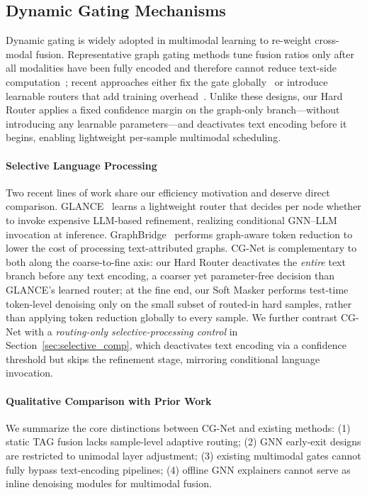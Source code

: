 \documentclass[preprint,12pt,authoryear]{elsarticle}
\begin{document}
\subsection{Dynamic Gating Mechanisms}
Dynamic gating is widely adopted in multimodal learning to re-weight cross-modal fusion. Representative graph gating methods tune fusion ratios only after all modalities have been fully encoded and therefore cannot reduce text-side computation~\citep{wei2023lightgt_icml}; recent approaches either fix the gate globally~\citep{yang2026globalgate} or introduce learnable routers that add training overhead~\citep{deng2026dyninfopath,lin2026freqexpert,zhang2026fedrgl}. Unlike these designs, our Hard Router applies a fixed confidence margin on the graph-only branch---without introducing any learnable parameters---and deactivates text encoding before it begins, enabling lightweight per-sample multimodal scheduling.

\paragraph{Selective Language Processing}
Two recent lines of work share our efficiency motivation and deserve direct comparison. GLANCE~\citep{loveland2026glance} learns a lightweight router that decides per node whether to invoke expensive LLM-based refinement, realizing conditional GNN--LLM invocation at inference. GraphBridge~\citep{wang2024graphbridge} performs graph-aware token reduction to lower the cost of processing text-attributed graphs. CG-Net is complementary to both along the coarse-to-fine axis: our Hard Router deactivates the \emph{entire} text branch before any text encoding, a coarser yet parameter-free decision than GLANCE's learned router; at the fine end, our Soft Masker performs test-time token-level denoising only on the small subset of routed-in hard samples, rather than applying token reduction globally to every sample. We further contrast CG-Net with a \emph{routing-only selective-processing control} in Section~\ref{sec:selective_comp}, which deactivates text encoding via a confidence threshold but skips the refinement stage, mirroring conditional language invocation.

\paragraph{Qualitative Comparison with Prior Work}
We summarize the core distinctions between CG-Net and existing methods:
(1) static TAG fusion lacks sample-level adaptive routing;
(2) GNN early-exit designs are restricted to unimodal layer adjustment;
(3) existing multimodal gates cannot fully bypass text-encoding pipelines;
(4) offline GNN explainers cannot serve as inline denoising modules for multimodal fusion.
\end{document}
